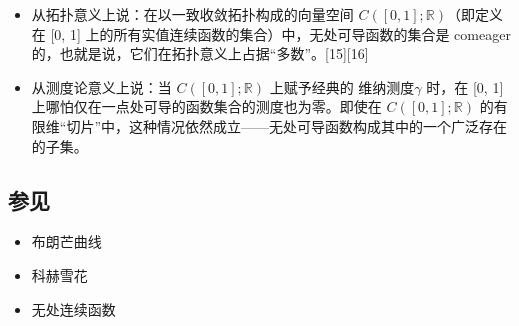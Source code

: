 \begin{itemize}
\item 从拓扑意义上说：在以一致收敛拓扑构成的向量空间 $C([0, 1]; \mathbb{R})$（即定义在 [0, 1] 上的所有实值连续函数的集合）中，无处可导函数的集合是 comeager 的，也就是说，它们在拓扑意义上占据“多数”。[15][16]
\item 从测度论意义上说：当 $C([0, 1]; \mathbb{R})$ 上赋予经典的 维纳测度$\gamma$ 时，在 [0, 1] 上哪怕仅在一点处可导的函数集合的测度也为零。即使在 $C([0, 1]; \mathbb{R})$ 的有限维“切片”中，这种情况依然成立——无处可导函数构成其中的一个广泛存在的子集。
\end{itemize}
\subsection{参见}
\begin{itemize}
\item 布朗芒曲线
\item 科赫雪花
\item 无处连续函数
\end{itemize}
